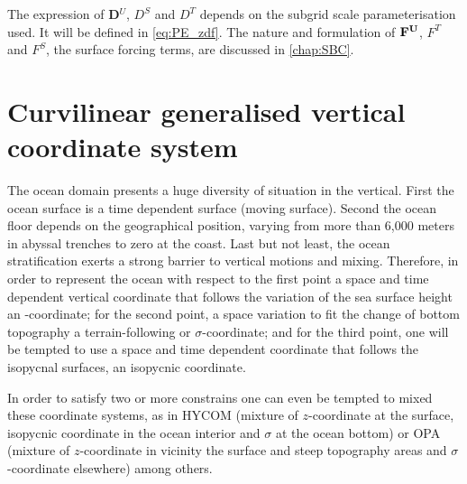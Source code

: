 \documentclass[../main/NEMO_manual]{subfiles}
\begin{document}
The expression of \textbf{D}$^{U}$, $D^{S}$ and $D^{T}$ depends on the subgrid scale parameterisation used.
It will be defined in \autoref{eq:PE_zdf}.
The nature and formulation of ${\rm {\bf F}}^{\rm {\bf U}}$, $F^T$ and $F^S$, the surface forcing terms,
are discussed in \autoref{chap:SBC}.


\newpage 

\section{Curvilinear generalised vertical coordinate system}
\label{sec:PE_gco}

The ocean domain presents a huge diversity of situation in the vertical.
First the ocean surface is a time dependent surface (moving surface).
Second the ocean floor depends on the geographical position,
varying from more than 6,000 meters in abyssal trenches to zero at the coast.
Last but not least, the ocean stratification exerts a strong barrier to vertical motions and mixing. 
Therefore, in order to represent the ocean with respect to
the first point a space and time dependent vertical coordinate that follows the variation of the sea surface height
\eg an \zstar-coordinate;
for the second point, a space variation to fit the change of bottom topography
\eg a terrain-following or $\sigma$-coordinate;
and for the third point, one will be tempted to use a space and time dependent coordinate that
follows the isopycnal surfaces, \eg an isopycnic coordinate.

In order to satisfy two or more constrains one can even be tempted to mixed these coordinate systems, as in
HYCOM (mixture of $z$-coordinate at the surface, isopycnic coordinate in the ocean interior and $\sigma$ at
the ocean bottom) \citep{Chassignet_al_JPO03} or
OPA (mixture of $z$-coordinate in vicinity the surface and steep topography areas and $\sigma$-coordinate elsewhere)
\citep{Madec_al_JPO96} among others.
\end{document}
